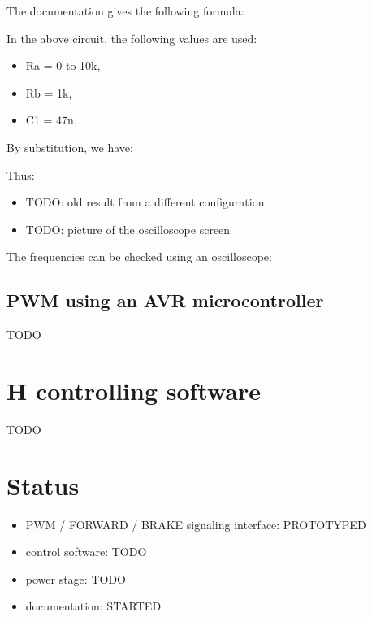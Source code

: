 \documentclass[12pt]{article}
\begin{document}
The documentation gives the following formula:
\begin{center}
\end{center}

In the above circuit, the following values are used:
\begin{itemize}
\item Ra = 0 to 10k,
\item Rb = 1k,
\item C1 = 47n.
\end{itemize}

By substitution, we have:
\begin{center}
\end{center}

Thus:
\begin{center}
\end{center}

\begin{itemize}
\item TODO: old result from a different configuration
\item TODO: picture of the oscilloscope screen
\end{itemize}
The frequencies can be checked using an oscilloscope:
\begin{center}
\end{center}

\subsection{PWM using an AVR microcontroller}
TODO

\newpage
\section{H controlling software}
TODO


\newpage
\section{Status}
\begin{itemize}
  \item PWM / FORWARD / BRAKE signaling interface: PROTOTYPED
  \item control software: TODO
  \item power stage: TODO
  \item documentation: STARTED
\end{itemize}
\end{document}
